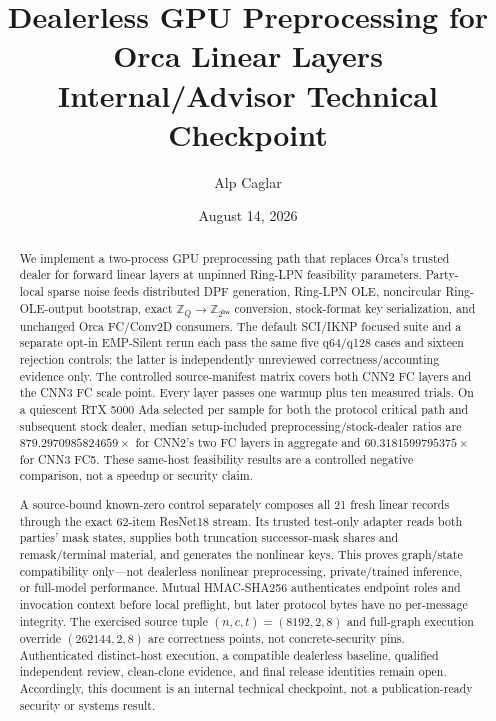 \documentclass[11pt]{article}
\title{Dealerless GPU Preprocessing for Orca Linear Layers\\
\large Internal/Advisor Technical Checkpoint}
\author{Alp Caglar}
\date{August 14, 2026}
\newcommand{\Z}{\mathbb{Z}}
\newcommand{\bw}{\mathsf{bw}}
\begin{document}
\maketitle

\begin{center}
\end{center}

\begin{abstract}
We implement a two-process GPU preprocessing path that replaces Orca's trusted
dealer for forward linear layers at unpinned Ring-LPN feasibility parameters.
Party-local sparse noise feeds distributed DPF generation, Ring-LPN OLE,
noncircular Ring-OLE-output bootstrap, exact $\Z_Q\!\to\!\Z_{2^\bw}$
conversion, stock-format key serialization, and unchanged Orca FC/Conv2D
consumers. The default SCI/IKNP focused suite and a separate opt-in EMP-Silent
rerun each pass the same five q64/q128 cases and sixteen rejection controls;
the latter is independently unreviewed correctness/accounting evidence only.
The controlled source-manifest matrix covers both CNN2 FC layers and the CNN3
FC scale point. Every layer passes one warmup plus ten measured trials. On a
quiescent RTX 5000 Ada selected per sample for both the protocol critical path
and subsequent stock dealer, median setup-included preprocessing/stock-dealer
ratios are $879.2970985824659\times$ for CNN2's two FC layers in aggregate and
$60.3181599795375\times$ for CNN3 FC5. These same-host feasibility results are
a controlled negative comparison, not a speedup or security claim.

A source-bound known-zero control separately composes all 21 fresh linear
records through the exact 62-item ResNet18 stream. Its trusted test-only
adapter reads both parties' mask states, supplies both truncation
successor-mask shares and remask/terminal material, and generates the nonlinear
keys. This proves graph/state compatibility only---not dealerless nonlinear
preprocessing, private/trained inference, or full-model performance. Mutual
HMAC-SHA256 authenticates endpoint roles and invocation context before local
preflight, but later protocol bytes have no per-message integrity. The
exercised source tuple $(n,c,t)=(8192,2,8)$ and full-graph execution override
$(262144,2,8)$ are correctness points, not concrete-security pins. Authenticated
distinct-host execution, a compatible dealerless baseline, qualified
independent review, clean-clone evidence, and final release identities remain
open. Accordingly, this document is an internal technical checkpoint, not a
publication-ready security or systems result.
\end{abstract}
\end{document}
